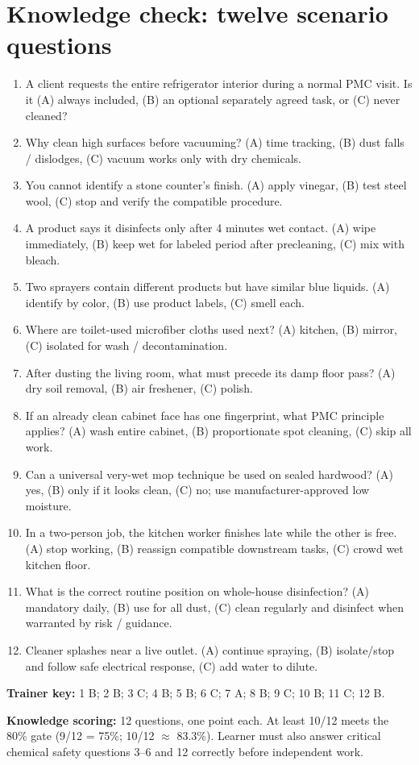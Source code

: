\documentclass[10pt,letterpaper,oneside]{article}
\begin{document}
\section{Knowledge check: twelve scenario questions}
\begin{enumerate}[label=\textbf{Q\arabic*.}]
\item A client requests the entire refrigerator interior during a normal PMC visit. Is it (A) always included, (B) an optional separately agreed task, or (C) never cleaned?
\item Why clean high surfaces before vacuuming? (A) time tracking, (B) dust falls / dislodges, (C) vacuum works only with dry chemicals.
\item You cannot identify a stone counter's finish. (A) apply vinegar, (B) test steel wool, (C) stop and verify the compatible procedure.
\item A product says it disinfects only after 4 minutes wet contact. (A) wipe immediately, (B) keep wet for labeled period after precleaning, (C) mix with bleach.
\item Two sprayers contain different products but have similar blue liquids. (A) identify by color, (B) use product labels, (C) smell each.
\item Where are toilet-used microfiber cloths used next? (A) kitchen, (B) mirror, (C) isolated for wash / decontamination.
\item After dusting the living room, what must precede its damp floor pass? (A) dry soil removal, (B) air freshener, (C) polish.
\item If an already clean cabinet face has one fingerprint, what PMC principle applies? (A) wash entire cabinet, (B) proportionate spot cleaning, (C) skip all work.
\item Can a universal very-wet mop technique be used on sealed hardwood? (A) yes, (B) only if it looks clean, (C) no; use manufacturer-approved low moisture.
\item In a two-person job, the kitchen worker finishes late while the other is free. (A) stop working, (B) reassign compatible downstream tasks, (C) crowd wet kitchen floor.
\item What is the correct routine position on whole-house disinfection? (A) mandatory daily, (B) use for all dust, (C) clean regularly and disinfect when warranted by risk / guidance.
\item Cleaner splashes near a live outlet. (A) continue spraying, (B) isolate/stop and follow safe electrical response, (C) add water to dilute.
\end{enumerate}
\begin{plainbox}\textbf{Trainer key:} 1 B; 2 B; 3 C; 4 B; 5 B; 6 C; 7 A; 8 B; 9 C; 10 B; 11 C; 12 B.\par\textbf{Knowledge scoring:} 12 questions, one point each. At least 10/12 meets the 80\% gate (9/12 = 75\%; 10/12 \(\approx\) 83.3\%). Learner must also answer critical chemical safety questions 3--6 and 12 correctly before independent work.\end{plainbox}
\end{document}
